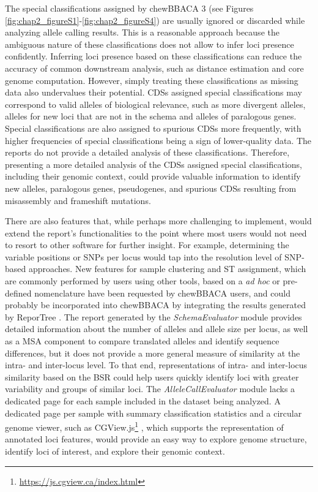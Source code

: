 The special classifications assigned by chewBBACA 3 (see Figures \ref{fig:chap2_figureS1}-\ref{fig:chap2_figureS4}) are usually ignored or discarded while analyzing allele calling results. This is a reasonable approach because the ambiguous nature of these classifications does not allow to infer loci presence confidently. Inferring loci presence based on these classifications can reduce the accuracy of common downstream analysis, such as distance estimation and core genome computation. However, simply treating these classifications as missing data also undervalues their potential. \ac{CDSs} assigned special classifications may correspond to valid alleles of biological relevance, such as more divergent alleles, alleles for new loci that are not in the schema and alleles of paralogous genes. Special classifications are also assigned to spurious \ac{CDSs} more frequently, with higher frequencies of special classifications being a sign of lower-quality data. The reports do not provide a detailed analysis of these classifications. Therefore, presenting a more detailed analysis of the \ac{CDSs} assigned special classifications, including their genomic context, could provide valuable information to identify new alleles, paralogous genes, pseudogenes, and spurious \ac{CDSs} resulting from misassembly and frameshift mutations.

There are also features that, while perhaps more challenging to implement, would extend the report's functionalities to the point where most users would not need to resort to other software for further insight. For example, determining the variable positions or \ac{SNPs} per locus would tap into the resolution level of \ac{SNP}-based approaches. New features for sample clustering and \ac{ST} assignment, which are commonly performed by users using other tools, based on a \textit{ad hoc} or pre-defined nomenclature have been requested by chewBBACA users, and could probably be incorporated into chewBBACA by integrating the results generated by ReporTree \cite{mixao_reportree_2023}. The report generated by the \textit{SchemaEvaluator} module provides detailed information about the number of alleles and allele size per locus, as well as a \ac{MSA} component to compare translated alleles and identify sequence differences, but it does not provide a more general measure of similarity at the intra- and inter-locus level. To that end, representations of intra- and inter-locus similarity based on the \ac{BSR} could help users quickly identify loci with greater variability and groups of similar loci. The \textit{AlleleCallEvaluator} module lacks a dedicated page for each sample included in the dataset being analyzed. A dedicated page per sample with summary classification statistics and a circular genome viewer, such as CGView.js\footnote{\url{https://js.cgview.ca/index.html}} \cite{stothard_visualizing_2019}, which supports the representation of annotated loci features, would provide an easy way to explore genome structure, identify loci of interest, and explore their genomic context.

